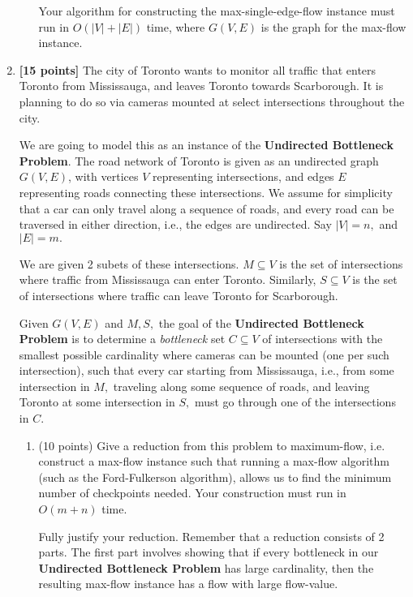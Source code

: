 \documentclass{assignment-373}
\begin{document}
\begin{enumerate}
\begin{enumerate}
    Your algorithm for constructing the max-single-edge-flow instance
    must run in $O(|V|+|E|)$ time, where $G(V, E)$ is the graph for
    the max-flow instance.
  \end{enumerate}
  
\item \textbf{[15 points]}
  The city of Toronto wants to monitor all traffic that enters Toronto
  from Mississauga, and leaves Toronto towards Scarborough. It is
  planning to do so via cameras mounted at select intersections
  throughout the city.

  We are going to model this as an instance of the \textbf{Undirected
    Bottleneck Problem}. The road network of Toronto is given as an
  undirected graph $G(V, E)$, with vertices $V$ representing
  intersections, and edges $E$ representing roads connecting these
  intersections. We assume for simplicity that a car can only travel
  along a sequence of roads, and every road can be traversed in either
  direction, i.e., the edges are undirected. Say $|V|=n,$ and $|E|=m.$

  We are given 2 subets of these intersections.  $M \subseteq V$ is
  the set of intersections where traffic from Mississauga can enter
  Toronto. Similarly, $S \subseteq V$ is the set of intersections
  where traffic can leave Toronto for Scarborough.

  Given $G(V, E)$ and $M, S,$ the goal of the \textbf{Undirected
    Bottleneck Problem} is to determine a \textit{bottleneck} set
  $C \subseteq V$ of intersections with the smallest possible
  cardinality where cameras can be mounted (one per such
  intersection), such that every car starting from Mississauga, i.e.,
  from some intersection in $M,$ traveling along some sequence of
  roads, and leaving Toronto at some intersection in $S,$ must go
  through one of the intersections in $C.$

  \begin{enumerate}
  \item (10 points) Give a reduction from this problem to
    maximum-flow, i.e. construct a max-flow instance such that running
    a max-flow algorithm (such as the Ford-Fulkerson algorithm),
    allows us to find the minimum number of checkpoints needed. Your
    construction must run in $O(m+n)$ time.

    Fully justify your reduction. Remember that a reduction consists
    of 2 parts. The first part involves showing that if every
    bottleneck in our \textbf{Undirected Bottleneck Problem} has large
    cardinality, then the resulting max-flow instance has a flow with
    large flow-value.


\end{enumerate}
\end{enumerate}
\end{document}
